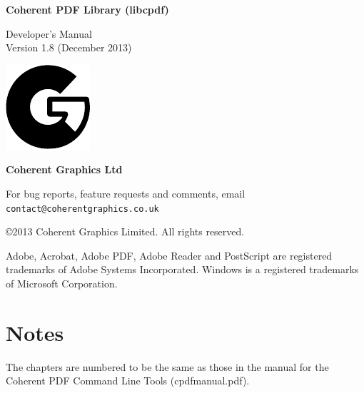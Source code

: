 \documentclass[a4paper]{memoir}
\newcommand{\smallgap}{\vspace{4mm}}
\begin{document}
\frontmatter
\thispagestyle{empty}

\begin{flushright}

{\sffamily \bfseries \Huge Coherent PDF Library (libcpdf)}

\vspace{12mm}

{\Huge Developer's Manual}\\\vspace{2mm}
Version 1.8 (December 2013)

\vspace{25mm}

\vfill

\includegraphics{logo.pdf}

\vspace{2mm}
{\sffamily \bfseries \LARGE Coherent Graphics Ltd}

\end{flushright}

\clearpage

\thispagestyle{empty}
\noindent For bug reports, feature requests and comments, email\\ \texttt{contact@coherentgraphics.co.uk}

\vspace*{\fill}
\noindent\copyright 2013 Coherent Graphics Limited. All rights reserved.

\smallgap 
\noindent Adobe, Acrobat, Adobe PDF, Adobe Reader and PostScript are
registered trademarks of Adobe Systems Incorporated. Windows is a registered trademarks of Microsoft Corporation.

\cleardoublepage
\tableofcontents

\cleardoublepage
\mainmatter
{}
\pagestyle{ruled}

\chapter*{Notes}

The chapters are numbered to be the same as those in the manual for the Coherent PDF Command Line Tools (cpdfmanual.pdf).
\end{document}
